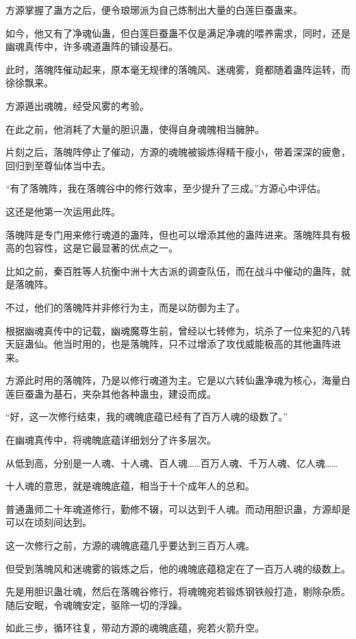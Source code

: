 \begin{this_body}
方源掌握了蛊方之后，便令琅琊派为自己炼制出大量的白莲巨蚕蛊来。

如今，他又有了净魂仙蛊，但白莲巨蚕蛊不仅是满足净魂的喂养需求，同时，还是幽魂真传中，许多魂道蛊阵的铺设基石。

此时，落魄阵催动起来，原本毫无规律的落魄风、迷魂雾，竟都随着蛊阵运转，而徐徐飘来。

方源遁出魂魄，经受风雾的考验。

在此之前，他消耗了大量的胆识蛊，使得自身魂魄相当臃肿。

片刻之后，落魄阵停止了催动，方源的魂魄被锻炼得精干瘦小，带着深深的疲惫，回归到至尊仙体当中去。

“有了落魄阵，我在落魄谷中的修行效率，至少提升了三成。”方源心中评估。

这还是他第一次运用此阵。

落魄阵是专门用来修行魂道的蛊阵，但也可以增添其他的蛊阵进来。落魄阵具有极高的包容性，这是它最显著的优点之一。

比如之前，秦百胜等人抗衡中洲十大古派的调查队伍，而在战斗中催动的蛊阵，就是落魄阵。

不过，他们的落魄阵并非修行为主，而是以防御为主了。

根据幽魂真传中的记载，幽魂魔尊生前，曾经以七转修为，坑杀了一位来犯的八转天庭蛊仙。他当时用的，也是落魄阵，只不过增添了攻伐威能极高的其他蛊阵进来。

方源此时用的落魄阵，乃是以修行魂道为主。它是以六转仙蛊净魂为核心，海量白莲巨蚕蛊为基石，夹杂其他各种蛊虫，建设而成。

“好，这一次修行结束，我的魂魄底蕴已经有了百万人魂的级数了。”

在幽魂真传中，将魂魄底蕴详细划分了许多层次。

从低到高，分别是一人魂、十人魂、百人魂……百万人魂、千万人魂、亿人魂……

十人魂的意思，就是魂魄底蕴，相当于十个成年人的总和。

普通蛊师二十年魂道修行，勤修不辍，可以达到千人魂。而动用胆识蛊，方源却是可以在顷刻间达到。

这一次修行之前，方源的魂魄底蕴几乎要达到三百万人魂。

但受到落魄风和迷魂雾的锻炼之后，他的魂魄底蕴稳定在了一百万人魂的级数上。

先是用胆识蛊壮魂，然后在落魄谷修行，将魂魄宛若锻炼钢铁般打造，剔除杂质。随后安眠，令魂魄安定，驱除一切的浮躁。

如此三步，循环往复，带动方源的魂魄底蕴，宛若火箭升空。


\end{this_body}
